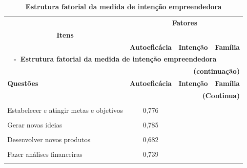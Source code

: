 \begin{center}

\begin{longtable}{p{6cm} c c c }

\caption{\textbf{Estrutura fatorial da medida de intenção empreendedora}}

\label{tabela_3} \\ \hline\hline

\multicolumn{1}{p{6cm}}{} & \multicolumn{3}{c}{\textbf{Fatores}}\\ 
 \multicolumn{1}{c}{\textbf{Itens}} & \multicolumn{3}{c}{\hrulefill}\\ 

 \multicolumn{1}{c}{} 
 &\multicolumn{1}{p{1.5cm}}{\textbf{Autoeficácia}} & \multicolumn{1}{p{1.5cm}}{\textbf{Intenção}} &\multicolumn{1}{p{1.5cm}}{\textbf{Família}}  
\\ \hline 

\endfirsthead


\multicolumn{4}{l}{{{\bfseries \tablename \ \thetable{} -\ \textbf{Estrutura fatorial da medida de intenção empreendedora}}}}\\
\multicolumn{4}{r}{\bfseries \textbf{(continuação)}}\\

\hline \multicolumn{1}{p{6cm}}{\textbf{Questões}} &\multicolumn{1}{c}{\textbf{Autoeficácia}} & \multicolumn{1}{c}{\textbf{Intenção}} &\multicolumn{1}{c}{\textbf{Família}}  
\\ \hline 

\endhead

\hline \multicolumn{4}{r}{\textbf{(Continua)}} \\ \hline


\endfoot
\hline \multicolumn{4}{r}{\textbf{(Conclusão)}} \\ \hline
\hline \hline

\endlastfoot


Estabelecer e atingir metas e objetivos
 &  0,776 & & \\\\
 
Gerar novas ideias
 &  0,785 & & \\\\
 
Desenvolver novos produtos
 &  0,682 & & \\\\
 
Fazer análises financeiras
 &  0,739 & & \\\\
 

\end{longtable}
\end{center}
